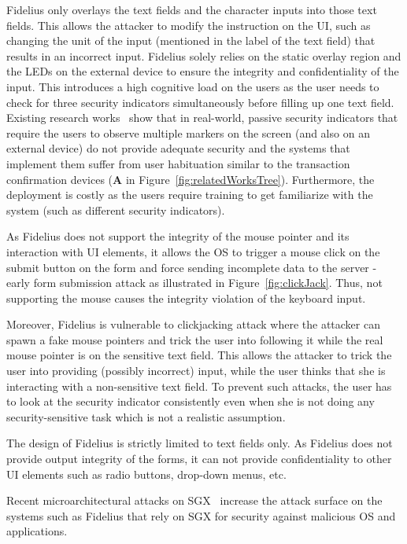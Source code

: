 \begin{mylist}
\item Fidelius only overlays the text fields and the character inputs into those
text fields. This allows the attacker to modify the instruction on the UI, such
as changing the unit of the input (mentioned in the label of the text field)
that results in an incorrect input. Fidelius solely relies on the static overlay
region and the LEDs on the external device to ensure the integrity and
confidentiality of the input. This introduces a high cognitive load on the users
as the user needs to check for three security indicators simultaneously before
filling up one text field. Existing research
works~\cite{egelman2008you,sobey2008exploring} show that in real-world, passive
security indicators that require the users to observe multiple markers on the
screen (and also on an external device) do not provide adequate security and the
systems that implement them suffer from user habituation similar to the
transaction confirmation devices (\textbf{A} in
Figure~\ref{fig:relatedWorksTree}). Furthermore, the deployment is costly as the users require training to get familiarize with the
system (such as different security indicators).
\item As Fidelius does not support the integrity of the mouse pointer and its
interaction with UI elements, it allows the OS to trigger a mouse click on the
submit button on the form and force sending incomplete data to the server -
early form submission attack as illustrated in Figure~\ref{fig:clickJack}. Thus,
not supporting the mouse causes the integrity violation of the keyboard input.


Moreover, Fidelius is vulnerable to clickjacking attack where the attacker can spawn a fake mouse pointers and trick the user into following it while the real mouse pointer is on the sensitive text field. 
This allows the attacker to trick the user into providing (possibly incorrect) input, while the user thinks that she is interacting with a non-sensitive text field. To prevent such attacks, the user has to look at the security indicator consistently even when she is not doing any security-sensitive task which is not a realistic assumption. 
\item The design of Fidelius is strictly limited to text fields only. As Fidelius does not provide output integrity of the forms, it can not provide confidentiality to other UI elements such as radio buttons, drop-down menus, etc.
\item Recent microarchitectural attacks on SGX~\cite{van2018foreshadow} increase the attack surface on the systems such as Fidelius that rely on SGX for security against malicious OS and applications. 
\end{mylist}



